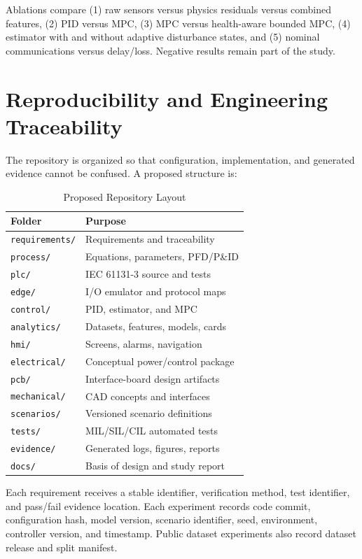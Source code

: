 \documentclass[conference]{IEEEtran}
\begin{document}
Ablations compare (1) raw sensors versus physics residuals versus combined features, (2) PID versus MPC, (3) MPC versus health-aware bounded MPC, (4) estimator with and without adaptive disturbance states, and (5) nominal communications versus delay/loss. Negative results remain part of the study.

\section{Reproducibility and Engineering Traceability}
The repository is organized so that configuration, implementation, and generated evidence cannot be confused. A proposed structure is:
\begin{table}[h]
\caption{Proposed Repository Layout}
\label{tab:repo}
\centering
\scriptsize
\begin{tabularx}{\columnwidth}{p{}Y}
\toprule
Folder & Purpose \\
\midrule
\texttt{requirements/} & Requirements and traceability \\
\texttt{process/} & Equations, parameters, PFD/P\&ID \\
\texttt{plc/} & IEC 61131-3 source and tests \\
\texttt{edge/} & I/O emulator and protocol maps \\
\texttt{control/} & PID, estimator, and MPC \\
\texttt{analytics/} & Datasets, features, models, cards \\
\texttt{hmi/} & Screens, alarms, navigation \\
\texttt{electrical/} & Conceptual power/control package \\
\texttt{pcb/} & Interface-board design artifacts \\
\texttt{mechanical/} & CAD concepts and interfaces \\
\texttt{scenarios/} & Versioned scenario definitions \\
\texttt{tests/} & MIL/SIL/CIL automated tests \\
\texttt{evidence/} & Generated logs, figures, reports \\
\texttt{docs/} & Basis of design and study report \\
\bottomrule
\end{tabularx}
\end{table}

Each requirement receives a stable identifier, verification method, test identifier, and pass/fail evidence location. Each experiment records code commit, configuration hash, model version, scenario identifier, seed, environment, controller version, and timestamp. Public dataset experiments also record dataset release and split manifest.
\end{document}
